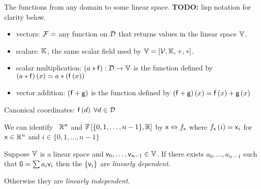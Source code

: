 \begin{example}
The functions from any domain to some linear space.
\textbf{TODO:} lisp notation for clarity below.
\begin{itemize}
  \item vectors: $\mathcal{F} = $ any function on $\mathcal{D}$
  that returns values in the linear space $\mathbb{V}$.
  \item scalars: $\mathbb{K}$, the same scalar field used by
  $\mathbb{V}=\left[ \mathcal{V}, \mathbb{K}, +, * \right]$.
  \item scalar multiplication:
  $ \left(a*\mathsf{f}\right) : \mathcal{D} \rightarrow \mathbb{V}$
  is the function defined by
   $ \left(a*\mathsf{f}\right) (x)
   = a*\left(\mathsf{f}\left( x \right) \right) $
  \item vector addition:
  $\left( \mathsf{f} + \mathsf{g} \right) $
  is the function defined by
  $\left( \mathsf{f} + \mathsf{g} \right) \left( x \right) =
  \mathsf{f} \left( x \right) + \mathsf{g} \left( x\right)$
\end{itemize}
Canonical coordinates: 
$\mathsf{f}\left( d \right) \; \forall d \in \mathcal{D}$
\end{example}

\begin{example}
We can identify~\cite[sec.~24]{Halmos1958Finite} 
$\mathbb{R}^n$ and 
$ \mathbb{F} \left[ \{ 0, 1, \ldots, {n-1} \}, \mathbb{R} \right] $
by
$\mathsf{x} \Leftrightarrow f_{\mathsf{x}}$
where $f_{\mathsf{x}} \left( i \right) = \mathsf{x}_i$
for $\mathsf{x} \in \mathbb{R}^n$ and 
$i \in \{ 0, 1, \ldots, {n-1} \}$
\end{example}

\begin{definition}
Suppose $\mathbb{V}$ is a linear space and
$\mathsf{v}_0, \ldots , \mathsf{v}_{n-1} \in \mathbb{V}$.
If there exists $a_0, \ldots , a_{n-1}$ such that
$\mathsf{0} = \sum a_i \mathsf{v}_i$ then the $\{ \mathsf{v}_i \}$
are \textit{linearly dependent}.
\cite[section~5]{halmos-1958}

Otherwise they are \textit{linearly independent}.
\end{definition}

